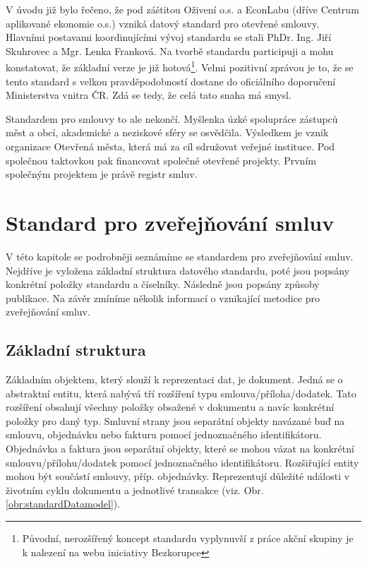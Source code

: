 V úvodu již bylo řečeno, že pod záštitou Oživení o.s.\cite{oz} a EconLabu\cite{econLab} (dříve Centrum aplikované ekonomie o.s.) vzniká datový standard pro otevřené smlouvy. Hlavními postavami koordinujícími vývoj standardu se stali PhDr. Ing. Jiří Skuhrovec a Mgr. Lenka Franková. Na tvorbě standardu participuji a mohu konstatovat, že základní verze je již hotová\footnote{Původní, nerozšířený koncept standardu vyplynuvší z práce akční skupiny je k nalezení na webu iniciativy Bezkorupce\cite{standard}}. Velmi pozitivní zprávou je to, že se tento standard s velkou pravděpodobností dostane do oficiálního doporučení Ministerstva vnitra ČR. Zdá se tedy, že celá tato snaha má smysl.

Standardem pro smlouvy to ale nekončí. Myšlenka úzké spolupráce zástupců měst a obcí, akademické a neziskové sféry se osvědčila. Výsledkem je vznik organizace Otevřená města\cite{otv}, která má za cíl sdružovat veřejné instituce. Pod společnou taktovkou pak financovat společné otevřené projekty. Prvním společným projektem je právě registr smluv.

\section{Standard pro zveřejňování smluv}

V této kapitole se podrobněji seznámíme se standardem pro zveřejňování smluv. Nejdříve je vyložena základní struktura datového standardu, poté jsou popsány konkrétní položky standardu a číselníky. Následně jsou popsány způsoby publikace. Na závěr zmíníme několik informací o vznikající metodice pro zveřejňování smluv. 

\subsection{Základní struktura}

Základním objektem, který slouží k reprezentaci dat, je dokument. Jedná se o abstraktní entitu, která nabývá tří rozšíření typu smlouva/příloha/dodatek. Tato rozšíření obsahují všechny položky obsažené v dokumentu a navíc konkrétní položky pro daný typ.
Smluvní strany jsou separátní objekty navázané buď na smlouvu, objednávku nebo fakturu pomocí jednoznačného identifikátoru.
Objednávka a faktura jsou separátní objekty, které se mohou vázat na konkrétní smlouvu/přílohu/dodatek pomocí jednoznačného identifikátoru.
Rozšiřující entity mohou být součástí smlouvy, příp. objednávky. Reprezentují důležité události v životním cyklu dokumentu a jednotlivé transakce (viz. Obr. \ref{obr:standardDatamodel}). 

